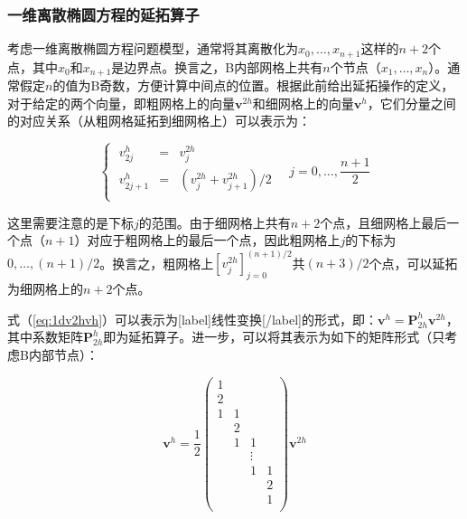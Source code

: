 \documentclass[12pt, UTF8, nofonts]{ctexart}
\begin{document}
\subsubsection*{一维离散椭圆方程的延拓算子}

考虑一维离散椭圆方程问题模型，通常将其离散化为$x_0,\ldots,x_{n+1}$这样的$n+2$个点，其中$x_0$和$x_{n+1}$是边界点。换言之，B内部网格上共有$n$个节点（$x_1,\ldots,x_n$）。通常假定$n$的值为B奇数，方便计算中间点的位置。根据此前给出延拓操作的定义，对于给定的两个向量，即粗网格上的向量$\boldsymbol{v}^{2h}$和细网格上的向量$\boldsymbol{v}^h$，它们分量之间的对应关系（从粗网格延拓到细网格上）可以表示为：

\begin{equation}
  \label{eq:1dv2hvh}
  \left\{\; \begin{array}{lcl}
    v_{2j}^{h} &=& v_{j}^{2h} \\
    v_{2j+1}^{h} &=& \left( v_{j}^{2h} + v_{j+1}^{2h} \right) \big/ 2 \\
  \end{array} \right. \quad j = 0,\ldots,\dfrac{n+1}{2}
\end{equation}

这里需要注意的是下标$j$的范围。由于细网格上共有$n+2$个点，且细网格上最后一个点（$n+1$）对应于粗网格上的最后一个点，因此粗网格上$j$的下标为$0,\ldots,(n+1)/2$。换言之，粗网格上$\left[v_{j}^{2h}\right]_{j=0}^{(n+1)/2}$共$(n+3)/2$个点，可以延拓为细网格上的$n+2$个点。

式（\ref{eq:1dv2hvh}）可以表示为[label]线性变换[/label]的形式，即：$\boldsymbol{v}^h=\boldsymbol{P}_{2h}^{h}\boldsymbol{v}^{2h}$，其中系数矩阵$\boldsymbol{P}_{2h}^{h}$即为延拓算子。进一步，可以将其表示为如下的矩阵形式（只考虑B内部节点）：

\begin{equation}
  \label{eq:1dmatform}
  \boldsymbol{v}^h = \dfrac{1}{2}
  \begin{pmatrix}
    1 & & & \\
    2 & & & \\
    1 & 1 & & \\
    & 2 & & \\
    & 1 & 1 & \\
    & & \vdots & \\
    & & 1 & 1 \\
    & & & 2 \\
    & & & 1 \\
  \end{pmatrix} \boldsymbol{v}^{2h}
\end{equation}
\end{document}
